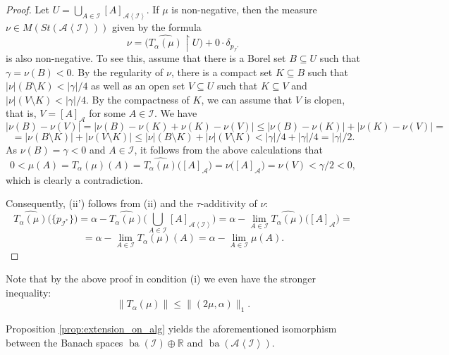 \documentclass[a4paper,11pt,fleqn]{amsart}
\theoremstyle{definition}
\theoremstyle{remark}
\numberwithin{equation}{section}
\newcommand{\R}{\mathbb{R}}
\newcommand{\aA}{\mathcal{A}}
\newcommand{\iI}{\mathcal{I}}
\DeclareMathOperator{\ba}{ba}
\newcommand{\rstr}{\restriction}
\newcommand{\sm}{\setminus}
\newcommand{\sub}{\subseteq}
\newcommand{\wh}{\widehat}
\newcommand{\gen}[1]{\mathopen{}\left\langle#1\mathclose{}\right\rangle}
\newcommand{\clopen}[1]{\left[#1\right]}
\begin{document}
\begin{proof}
\medskip

Let $U=\bigcup_{A\in\iI}\clopen{A}_{\aA\gen{\iI}}$. If $\mu$ is non-negative, then the measure $\nu\in M(St(\aA\gen{\iI}))$ given by the formula 
\[\nu=\Big(\wh{T_\alpha(\mu)}\rstr U\Big)+0\cdot\delta_{p_{\iI^*}}\]
is also non-negative. To see this, assume that there is a Borel set $B\sub U$ such that $\gamma=\nu(B)<0$. By the regularity of $\nu$, there is a compact set $K\sub B$ such that $|\nu|(B\sm K)<|\gamma|/4$ as well as an open set $V\sub U$ such that $K\sub V$ and $|\nu|(V\sm K)<|\gamma|/4$. By the compactness of $K$, we can assume that $V$ is clopen, that is, $V=\clopen{A}_\aA$ for some $A\in\iI$. We have
\[|\nu(B)-\nu(V)|=\big|\nu(B)-\nu(K)+\nu(K)-\nu(V)\big|\le|\nu(B)-\nu(K)|+|\nu(K)-\nu(V)|=\]
\[=|\nu(B\sm K)|+|\nu(V\sm K)|\le|\nu|(B\sm K)+|\nu|(V\sm K)<|\gamma|/4+|\gamma|/4=|\gamma|/2.\]
As $\nu(B)=\gamma<0$ and $A\in\iI$, it follows from the above calculations that
\[0<\mu(A)=T_\alpha(\mu)(A)=\wh{T_\alpha(\mu)}\big(\clopen{A}_\aA\big)=\nu\big(\clopen{A}_\aA\big)=\nu(V)<\gamma/2<0,\]
which is clearly a contradiction.

Consequently, (ii') follows from (ii) and the $\tau$-additivity of $\nu$:
\[\wh{T_\alpha(\mu)}\big(\big\{p_{\iI^*}\big\}\big)=\alpha-\wh{T_\alpha(\mu)}\Big(\bigcup_{A\in\iI}\clopen{A}_{\aA\gen{\iI}}\Big)=\alpha-\lim_{A\in\iI}\wh{T_\alpha(\mu)}\big(\clopen{A}_\aA\big)=\]
\[=\alpha-\lim_{A\in\iI}T_\alpha(\mu)(A)=\alpha-\lim_{A\in\iI}\mu(A).\]
\end{proof}

Note that by the above proof in condition (i) we even have the stronger inequality:
\[\big\|T_\alpha(\mu)\big\|\le\|(2\mu,\alpha)\|_1.\]


\medskip

Proposition \ref{prop:extension_on_alg} yields the aforementioned isomorphism between the Banach spaces $\ba(\iI)\oplus\R$ and $\ba(\aA\gen{\iI})$.
\end{document}
